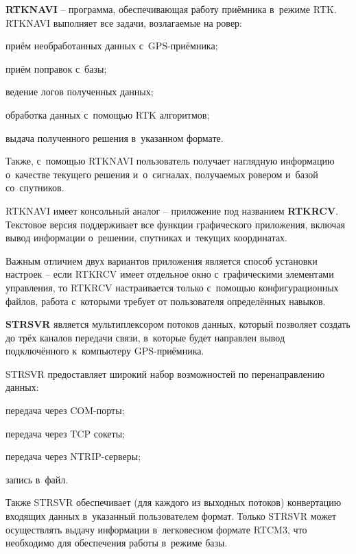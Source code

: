 \begin{dashitemize}
  \item \textbf{RTKNAVI} -- программа, обеспечивающая работу приёмника в~режиме RTK. RTKNAVI выполняет все задачи, возлагаемые на ровер:
  \begin{dashitemize}
    \item приём необработанных данных с~GPS-приёмника;
    \item приём поправок с~базы;
    \item ведение логов полученных данных;
    \item обработка данных с~помощью RTK алгоритмов;
    \item выдача полученного решения в~указанном формате.
  \end{dashitemize}

  Также, с~помощью RTKNAVI пользователь получает наглядную информацию о~качестве текущего решения и~о~сигналах, получаемых ровером и~базой со~спутников. \par
  
  RTKNAVI имеет консольный аналог -- приложение под названием \textbf{RTKRCV}. Текстовое версия поддерживает все функции графического приложения, включая вывод информации о~решении, спутниках и~текущих координатах. \par
  Важным отличием двух вариантов приложения является способ установки настроек -- если RTKRCV имеет отдельное окно с~графическими элементами управления, то RTKRCV настраивается только с~помощью конфигурационных файлов, работа с~которыми требует от пользователя определённых навыков.
  
  \item \textbf{STRSVR} является мультиплексором потоков данных, который позволяет создать до трёх каналов передачи связи, в~которые будет направлен вывод подключённого к~компьютеру GPS-приёмника. \par
  STRSVR предоставляет широкий набор возможностей по перенаправлению данных:
  
  \begin{dashitemize}
    \item передача через COM-порты;
    \item передача через TCP сокеты;
    \item передача через NTRIP-серверы;
    \item запись в~файл.
  \end{dashitemize}

  Также STRSVR обеспечивает (для каждого из выходных потоков) конвертацию входящих данных в~указанный пользователем формат. Только STRSVR может осуществлять выдачу информации в~легковесном формате RTCM3, что необходимо для обеспечения работы в~режиме базы. \par
  

\end{dashitemize}
